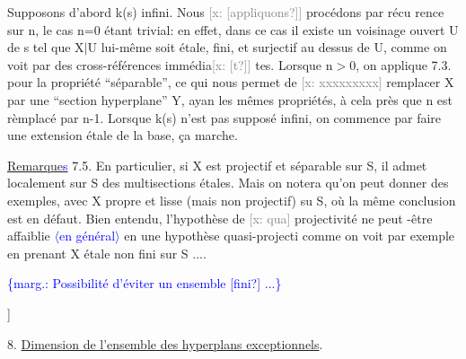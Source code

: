 \documentclass[11pt]{article}
\newcommand{\scanpage}[1]{\par\bigskip\noindent{\small\sffamily[scan #1]}\par}
\newcommand{\mspage}[1]{{\small\sffamily[p.\,#1]}}
\newcommand{\hand}[1]{\textcolor{blue}{#1}}
\newcommand{\inserted}[2][]{\textcolor{blue}{$\langle$#2$\rangle$}}
\newcommand{\margin}[1]{\textcolor{blue}{\{\textsf{marg.:} #1\}}}
\newcommand{\xout}[1]{\textcolor{gray}{[\textsf{x:} #1]}}
\newcommand{\uline}[1]{\underline{#1}}
\newcommand{\unsure}[1]{[#1?]}
\begin{document}
Supposons d'abord k(s) infini. Nous \xout{\unsure{appliquons}} procédons par récu%
rence sur n, le cas n=0 étant trivial: en effet, dans ce cas il existe
un voisinage ouvert U de s tel que X$|$U lui-même soit étale, fini, et
surjectif au dessus de U, comme on voit par des cross-références immédia\xout{\unsure{t}}
tes. Lorsque n$>$0, on applique 7.3. pour la propriété ``séparable'', ce qui
nous permet de \xout{xxxxxxxxx} remplacer X par une ``section hyperplane'' Y, ayan
les mêmes propriétés, à cela près que n est rèmplacé par n-1. Lorsque
k(s) n'est pas supposé infini, on commence par faire une extension étale
de la base, ça marche.

\uline{Remarque\hand{s}} 7.5. En particulier, si X est projectif et séparable sur S,
il admet localement sur S des multisections étales. Mais on notera qu'on
peut donner des exemples, avec X propre et lisse (mais non projectif) su
S, où la même conclusion est en défaut. Bien entendu, l'hypothèse de
\xout{qua} projectivité ne peut -être affaiblie \inserted{en général} en une hypothèse quasi-projecti
comme on voit par exemple en prenant X étale non fini sur S ....

\margin{Possibilité d'éviter un ensemble \unsure{fini} ...}

\mspage{30}

\clearpage
\scanpage{25/31}
\mspage{\unsure{27}}

8. \uline{Dimension de l'ensemble des hyperplans exceptionnels}.
\end{document}
